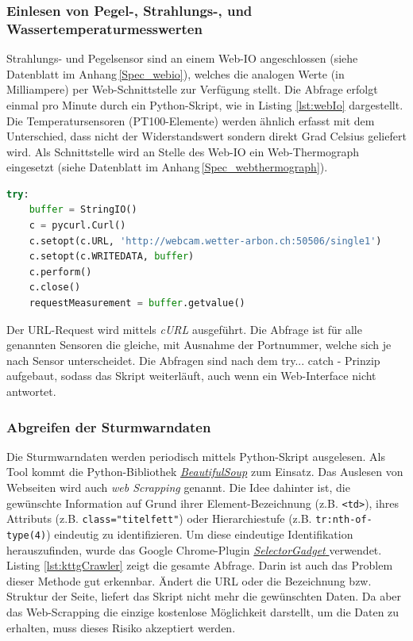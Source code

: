\subsubsection{Einlesen von Pegel-, Strahlungs-, und Wassertemperaturmesswerten}
Strahlungs- und Pegelsensor sind an einem Web-IO angeschlossen (siehe Datenblatt im Anhang\,\ref{Spec_webio}), welches die analogen Werte (in Milliampere) per Web-Schnittstelle zur Verfügung stellt. Die Abfrage erfolgt einmal pro Minute durch ein Python-Skript, wie in Listing \ref{lst:webIo} dargestellt. Die Temperatursensoren (PT100-Elemente) werden ähnlich erfasst mit dem Unterschied, dass nicht der Widerstandswert sondern direkt Grad Celsius geliefert wird. Als Schnittstelle wird an Stelle des Web-IO ein Web-Thermograph eingesetzt (siehe Datenblatt im Anhang\,\ref{Spec_webthermograph}).

\begin{lstlisting}[label=lst:webIo,caption=Python-Script zur Web-Abfrage des Pegel-Messwerts, language=python, style=py]
try:
    buffer = StringIO()
    c = pycurl.Curl()
    c.setopt(c.URL, 'http://webcam.wetter-arbon.ch:50506/single1')
    c.setopt(c.WRITEDATA, buffer)
    c.perform()
    c.close()
    requestMeasurement = buffer.getvalue()
\end{lstlisting}

\noindent
Der URL-Request wird mittels \emph{cURL} ausgeführt. Die Abfrage ist für alle genannten Sensoren die gleiche, mit Ausnahme der Portnummer, welche sich je nach Sensor unterscheidet. Die Abfragen sind nach dem try... catch - Prinzip aufgebaut, sodass das Skript weiterläuft, auch wenn ein Web-Interface nicht antwortet.



\subsubsection{Abgreifen der Sturmwarndaten}
\label{kap:abgrSturmwarnung}
Die Sturmwarndaten werden periodisch mittels Python-Skript ausgelesen. Als Tool kommt die Python-Bibliothek \href{https://www.crummy.com/software/BeautifulSoup/}{\emph{BeautifulSoup}} zum Einsatz. Das Auslesen von Webseiten wird auch \emph{web Scrapping} genannt. Die Idee dahinter ist, die gewünschte Information auf Grund ihrer Element-Bezeichnung (z.B. \texttt{<td>}), ihres Attributs (z.B. \texttt{class="titelfett"}) oder Hierarchiestufe (z.B. \texttt{tr:nth-of-type(4)}) eindeutig zu identifizieren. Um diese eindeutige Identifikation herauszufinden, wurde das Google Chrome-Plugin \href{https://selectorgadget.com/}{\emph{SelectorGadget }} verwendet. Listing \ref{lst:kttgCrawler} zeigt die gesamte Abfrage. Darin ist auch das Problem dieser Methode gut erkennbar. Ändert die URL oder die Bezeichnung bzw. Struktur der Seite, liefert das Skript nicht mehr die gewünschten Daten. Da aber das Web-Scrapping die einzige kostenlose Möglichkeit darstellt, um die Daten zu erhalten, muss dieses Risiko akzeptiert werden.


